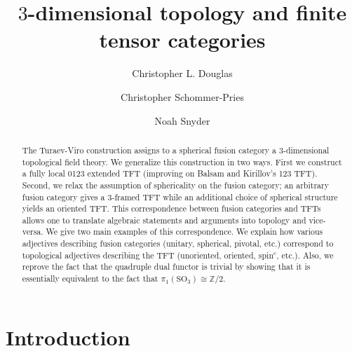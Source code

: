 \documentclass{amsart}
\begin{document}
\title{$3$-dimensional topology and finite tensor categories}

\begin{abstract}
The Turaev-Viro construction assigns to a spherical fusion category a 3-dimensional topological field theory.  We generalize this construction in two ways. First we construct a fully local 0123 extended TFT (improving on Balsam and Kirillov's 123 TFT).  Second, we relax the assumption of sphericality on the fusion category; an arbitrary fusion category gives a $3$-framed TFT while an additional choice of spherical structure yields an oriented TFT.  This correspondence between fusion categories and TFTs allows one to translate algebraic statements and arguments into topology and vice-versa.  We give two main examples of this correspondence.  We explain how various adjectives describing fusion categories (unitary, spherical, pivotal, etc.) correspond to topological adjectives describing the TFT (unoriented, oriented, spin${}^c$, etc.).  Also, we reprove the fact that the quadruple dual functor is trivial by showing that it is essentially equivalent to the fact that $\pi_1(\mathrm{SO}_3) \cong \mathbb{Z}/2$.
\end{abstract}
	
\author{Christopher L. Douglas}
\address{Department of Mathematics, University of California, Berkeley, CA 94720, USA}
	
\author{Christopher Schommer-Pries}
\address{Department of Mathematics \\
} %

\author{Noah Snyder}
\address{}

\maketitle	
\setcounter{tocdepth}{3}
\tableofcontents

\section{Introduction}

\end{document}
